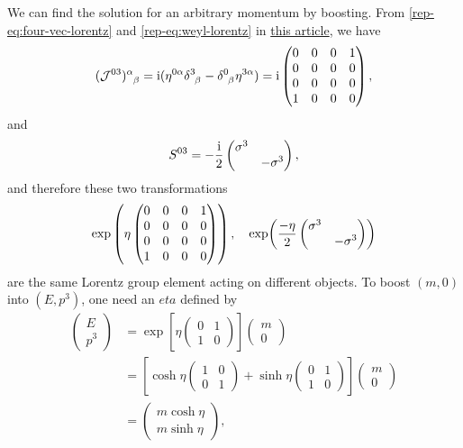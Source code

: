 \documentclass[hyperref, a4paper]{article}
\newcommand*{\ii}{\mathrm{i}}
\newcommand{\lorentzrep}{\href{lorentz-rep.pdf}{this article}}
\begin{document}
We can find the solution for an arbitrary momentum by boosting. From \eqref{rep-eq:four-vec-lorentz} and 
\eqref{rep-eq:weyl-lorentz} in \lorentzrep, we have 
\[
    (\mathcal{J}^{03})\indices{^\alpha_\beta} = \ii (\eta^{0 \alpha} \delta\indices{^3_\beta} - \delta\indices{^0_\beta} \eta^{3 \alpha}) = \ii \pmqty{ 0 & 0 & 0 & 1 \\ 0 & 0 & 0 & 0 \\ 0 & 0 & 0 & 0 \\ 1 & 0 & 0 & 0 },
\]
and 
\[
    S^{03} = - \frac{\ii}{2} \pmqty{\dmat{\sigma^3, - \sigma^3}},
\]
and therefore these two transformations 
\[
    \exp\left( \eta \pmqty{ 0 & 0 & 0 & 1 \\ 0 & 0 & 0 & 0 \\ 0 & 0 & 0 & 0 \\ 1 & 0 & 0 & 0 } \right), \quad 
    \exp(\frac{- \eta}{2} \pmqty{\dmat{\sigma^3, - \sigma^3}} )
\]
are the same Lorentz group element acting on different objects. To boost $(m, 0)$ into $(E, p^3)$, one need 
an $eta$ defined by 
\begin{equation}
    \begin{aligned}
        \left(\begin{array}{c}
        E \\
        p^{3}
        \end{array}\right) &=\exp \left[\eta\left(\begin{array}{ll}
        0 & 1 \\
        1 & 0
        \end{array}\right)\right]\left(\begin{array}{c}
        m \\
        0
        \end{array}\right) \\
        &=\left[\cosh \eta\left(\begin{array}{ll}
        1 & 0 \\
        0 & 1
        \end{array}\right)+\sinh \eta\left(\begin{array}{ll}
        0 & 1 \\
        1 & 0
        \end{array}\right)\right]\left(\begin{array}{c}
        m \\
        0
        \end{array}\right) \\
        &=\left(\begin{array}{c}
        m \cosh \eta \\
        m \sinh \eta
        \end{array}\right) ,
        \end{aligned}
    \label{eq:momentum-change}
\end{equation}
\end{document}
